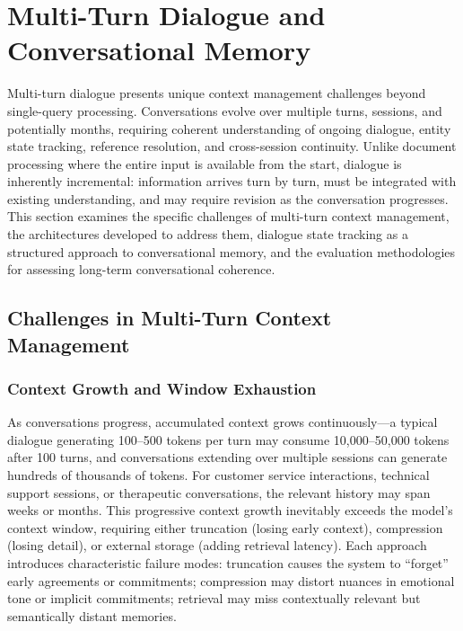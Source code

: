 \documentclass[11pt,letterpaper]{article}
\begin{document}
\section{Multi-Turn Dialogue and Conversational Memory}
\label{sec:multiturn}

Multi-turn dialogue presents unique context management challenges beyond single-query processing. Conversations evolve over multiple turns, sessions, and potentially months, requiring coherent understanding of ongoing dialogue, entity state tracking, reference resolution, and cross-session continuity. Unlike document processing where the entire input is available from the start, dialogue is inherently incremental: information arrives turn by turn, must be integrated with existing understanding, and may require revision as the conversation progresses. This section examines the specific challenges of multi-turn context management, the architectures developed to address them, dialogue state tracking as a structured approach to conversational memory, and the evaluation methodologies for assessing long-term conversational coherence.

\subsection{Challenges in Multi-Turn Context Management}

\subsubsection{Context Growth and Window Exhaustion}

As conversations progress, accumulated context grows continuously---a typical dialogue generating 100--500 tokens per turn may consume 10,000--50,000 tokens after 100 turns, and conversations extending over multiple sessions can generate hundreds of thousands of tokens. For customer service interactions, technical support sessions, or therapeutic conversations, the relevant history may span weeks or months. This progressive context growth inevitably exceeds the model's context window, requiring either truncation (losing early context), compression (losing detail), or external storage (adding retrieval latency). Each approach introduces characteristic failure modes: truncation causes the system to ``forget'' early agreements or commitments; compression may distort nuances in emotional tone or implicit commitments; retrieval may miss contextually relevant but semantically distant memories.
\end{document}
